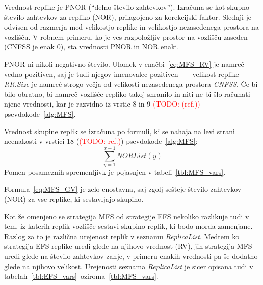\documentclass[a4paper, 12pt]{book}
\newcommand{\TODO}[1]{\textcolor{red}{(TODO: #1)}}
\begin{document}
Vrednost replike je PNOR (``delno število zahtevkov''). Izračuna
se kot skupno število zahtevkov za repliko (NOR), prilagojeno za
korekcijski faktor. Slednji je odvisen od razmerja med velikostjo replike
in velikostjo nezasedenega prostora na vozlišču. V robnem primeru,
ko je ves razpoložljiv prostor na vozlišču zaseden (CNFSS je enak 0), sta
vrednosti PNOR in NOR enaki.

PNOR ni nikoli negativno število. Ulomek v enačbi~\eqref{eq:MFS_RV} je namreč
vedno pozitiven, saj je tudi njegov imenovalec pozitiven~---~velikost replike
\textit{RR.Size} je namreč strogo večja od velikosti nezasedenega prostora
\textit{CNFSS}. Če bi bilo obratno, bi namreč vozlišče repliko takoj shranilo
in niti ne bi šlo računati njene vrednosti, kar je razvidno iz vrstic 8 in 9
\TODO{(ref.)} psevdokode~\ref{alg:MFS}.

\begin{samepage}
Vrednost skupine replik se izračuna po formuli, ki se nahaja na levi strani
neenakosti v vrstici 18 (\TODO{ref.}) psevdokode~\ref{alg:MFS}:
\begin{equation}
	\sum\limits_{y=1}^{x-1} \mathit{NORList(y)}
  \label{eq:MFS_GV}
\end{equation}
Pomen posameznih spremenljivk je pojasnjen v tabeli~\ref{tbl:MFS_vars}.
\end{samepage}
\vspace{1em}

Formula~\eqref{eq:MFS_GV} je zelo enostavna, saj zgolj sešteje število
zahtevkov (NOR) za vse replike, ki sestavljajo skupino.

Kot že omenjeno se strategija MFS od strategije EFS nekoliko razlikuje
tudi v tem, iz katerih replik vozlišče sestavi skupino replik, ki bodo morda
zamenjane. Razlog za to je različna urejenost replik v seznamu
\textit{ReplicaList}. Medtem ko strategija EFS replike uredi glede na
njihovo vrednost (RV), jih strategija MFS uredi glede na
število zahtevkov zanje, v primeru enakih vrednosti pa še dodatno
glede na njihovo velikost. Urejenosti seznama \textit{ReplicaList} je
sicer opisana tudi v tabelah~\ref{tbl:EFS_vars}~oziroma~\ref{tbl:MFS_vars}.
\end{document}
